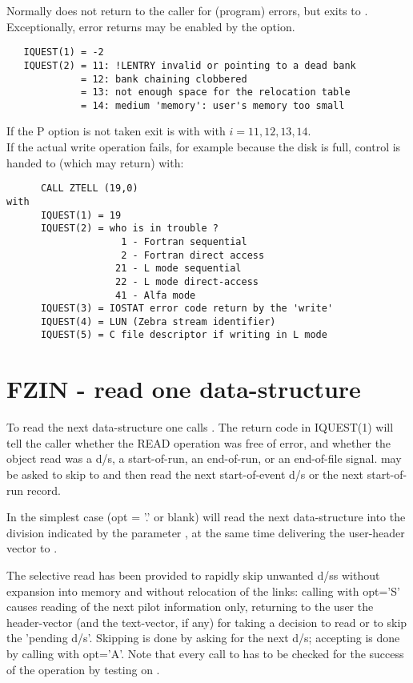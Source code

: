 Normally  does not return to the caller for (program) errors,
but exits to .
Exceptionally, error returns may be enabled by the  option.
\begin{verbatim}
   IQUEST(1) = -2
   IQUEST(2) = 11: !LENTRY invalid or pointing to a dead bank
             = 12: bank chaining clobbered
             = 13: not enough space for the relocation table
             = 14: medium 'memory': user's memory too small
\end{verbatim}
If the P option is not taken exit is with
 with $i=11,12,13,14$. \\[2mm]

If the actual write operation fails,
for example because the disk is full,
control is handed to  (which may return) with:
\begin{verbatim}
      CALL ZTELL (19,0)
with
      IQUEST(1) = 19
      IQUEST(2) = who is in trouble ?
                    1 - Fortran sequential
                    2 - Fortran direct access
                   21 - L mode sequential
                   22 - L mode direct-access
                   41 - Alfa mode
      IQUEST(3) = IOSTAT error code return by the 'write'
      IQUEST(4) = LUN (Zebra stream identifier)
      IQUEST(5) = C file descriptor if writing in L mode
\end{verbatim}

\section{FZIN - read one data-structure}

To read the next data-structure one calls .
The return code in IQUEST(1) will tell the caller whether
the READ operation was free of error, and whether the
object read was a d/s, a start-of-run, an end-of-run,
or an end-of-file signal.
 may be asked to skip to and then read the next start-of-event
d/s or the next start-of-run record.

In the simplest case (opt = '.' or blank)  will read the next
data-structure into the division indicated by the parameter ,
at the same time delivering the user-header vector to .

The selective read has been provided to rapidly skip unwanted
d/ss without expansion into memory and without relocation
of the links:
calling  with opt='S' causes reading of the next pilot
information only,
returning to the user the header-vector (and the text-vector, if any)
for taking a decision to read or to skip the 'pending d/s'.
Skipping is done by asking for the next d/s;
accepting is done by calling  with opt='A'.
Note that every call to  has to be checked for the success of
the operation by testing on .

